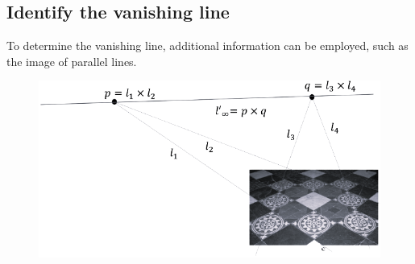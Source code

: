 \subsection*{Identify the vanishing line}
To determine the vanishing line, additional information can be employed, such as the image of parallel lines.
\begin{figure}[H]
    \centering
    \includegraphics[width=0.5\linewidth]{images/van.png}
\end{figure}